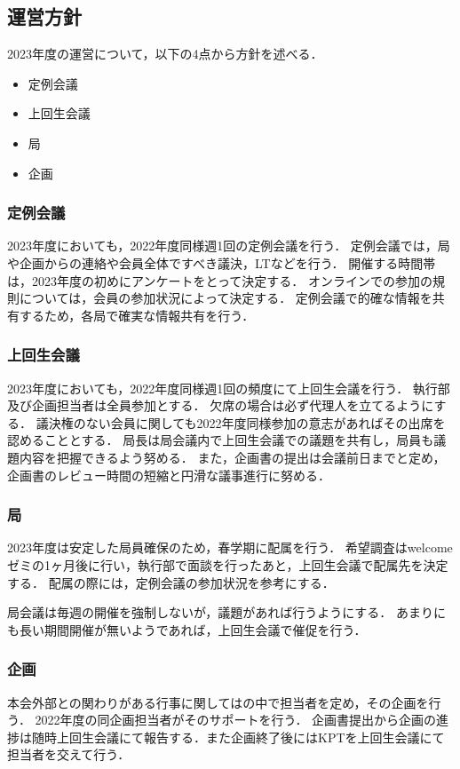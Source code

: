 \subsection*{運営方針}


2023年度の運営について，以下の4点から方針を述べる．
\begin{itemize}
    \item 定例会議
    \item 上回生会議
    \item 局
    \item 企画
\end{itemize}

\subsubsection*{定例会議}
2023年度においても，2022年度同様週1回の定例会議を行う．
定例会議では，局や企画からの連絡や会員全体ですべき議決，LTなどを行う．
開催する時間帯は，2023年度の初めにアンケートをとって決定する．
オンラインでの参加の規則については，会員の参加状況によって決定する．
定例会議で的確な情報を共有するため，各局で確実な情報共有を行う．

\subsubsection*{上回生会議}
2023年度においても，2022年度同様週1回の頻度にて上回生会議を行う．
執行部及び企画担当者は全員参加とする．
欠席の場合は必ず代理人を立てるようにする．
議決権のない会員に関しても2022年度同様参加の意志があればその出席を認めることとする．
局長は局会議内で上回生会議での議題を共有し，局員も議題内容を把握できるよう努める．
また，企画書の提出は会議前日までと定め，企画書のレビュー時間の短縮と円滑な議事進行に努める．

\subsubsection*{局}
2023年度は安定した局員確保のため，春学期に配属を行う．
希望調査はwelcomeゼミの1ヶ月後に行い，執行部で面談を行ったあと，上回生会議で配属先を決定する．
配属の際には，定例会議の参加状況を参考にする．

局会議は毎週の開催を強制しないが，議題があれば行うようにする．
あまりにも長い期間開催が無いようであれば，上回生会議で催促を行う．

\subsubsection*{企画}
本会外部との関わりがある行事に関しては\newGradeIfKouki{}\secondGrade{}の中で担当者を定め，その企画を行う．
2022年度の同企画担当者がそのサポートを行う．
企画書提出から企画の進捗は随時上回生会議にて報告する．また企画終了後にはKPTを上回生会議にて担当者を交えて行う．
